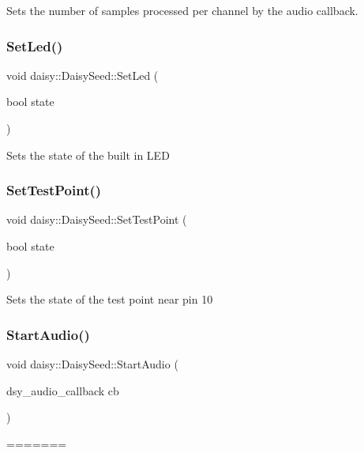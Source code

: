 \begin{DoxyCompactItemize}
Sets the number of samples processed per channel by the audio callback. \mbox{\label{classdaisy_1_1_daisy_seed_ac4501329b4a5a5cfb9e3cd6003fcda6f}} 
\subsubsection{\texorpdfstring{Set\+Led()}{SetLed()}}
{\footnotesize\ttfamily void daisy\+::\+Daisy\+Seed\+::\+Set\+Led (\begin{DoxyParamCaption}\item[{bool}]{state }\end{DoxyParamCaption})}

Sets the state of the built in L\+ED \mbox{\label{classdaisy_1_1_daisy_seed_a213214b79bb612175f2e82241887d42e}} 
\subsubsection{\texorpdfstring{Set\+Test\+Point()}{SetTestPoint()}}
{\footnotesize\ttfamily void daisy\+::\+Daisy\+Seed\+::\+Set\+Test\+Point (\begin{DoxyParamCaption}\item[{bool}]{state }\end{DoxyParamCaption})}

Sets the state of the test point near pin 10 \mbox{\label{classdaisy_1_1_daisy_seed_a3a0b0dd45b4b87808f7d67912d4b7422}} 
\subsubsection{\texorpdfstring{Start\+Audio()}{StartAudio()}}
{\footnotesize\ttfamily void daisy\+::\+Daisy\+Seed\+::\+Start\+Audio (\begin{DoxyParamCaption}\item[{dsy\+\_\+audio\+\_\+callback}]{cb }\end{DoxyParamCaption})}
=======

\end{DoxyCompactItemize}
